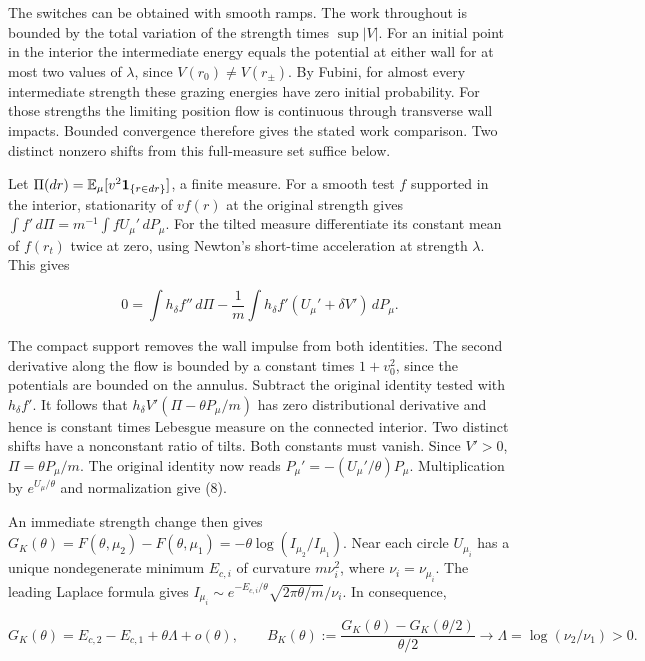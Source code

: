 \documentclass[11pt,a4paper]{article}
\begin{document}
The switches can be obtained with smooth ramps. The work throughout is
bounded by the total variation of the strength times \(\sup|V|\). For an
initial point in the interior the intermediate energy equals the
potential at either wall for at most two values of \(\lambda\), since
\(V(r_0)\ne V(r_\pm)\). By Fubini, for almost every intermediate
strength these grazing energies have zero initial probability. For those
strengths the limiting position flow is continuous through transverse
wall impacts. Bounded convergence therefore gives the stated work
comparison. Two distinct nonzero shifts from this full-measure set
suffice below.

Let \(\Pi(dr)=\mathbb E_\mu[v^2{\bf1}_{\{r\in dr\}}]\), a finite
measure. For a smooth test \(f\) supported in the interior, stationarity
of \(vf(r)\) at the original strength gives
\(\int f'\,d\Pi=m^{-1}\int f U_\mu'\,dP_\mu\). For the tilted measure
differentiate its constant mean of \(f(r_t)\) twice at zero, using
Newton's short-time acceleration at strength \(\lambda\). This gives

\[
 0=\int h_\delta f''\,d\Pi
    -\frac1m\int h_\delta f'(U_\mu'+\delta V')\,dP_\mu.             \tag{9}
\]

The compact support removes the wall impulse from both identities. The
second derivative along the flow is bounded by a constant times
\(1+v_0^2\), since the potentials are bounded on the annulus. Subtract
the original identity tested with \(h_\delta f'\). It follows that
\(h_\delta V'(\Pi-\theta P_\mu/m)\) has zero distributional derivative
and hence is constant times Lebesgue measure on the connected interior.
Two distinct shifts have a nonconstant ratio of tilts. Both constants
must vanish. Since \(V'>0\), \(\Pi=\theta P_\mu/m\). The original
identity now reads \(P_\mu'=-(U_\mu'/\theta)P_\mu\). Multiplication by
\(e^{U_\mu/\theta}\) and normalization give (8).

An immediate strength change then gives
\(G_K(\theta)=F(\theta,\mu_2)-F(\theta,\mu_1)
=-\theta\log(I_{\mu_2}/I_{\mu_1})\). Near each circle \(U_{\mu_i}\) has
a unique nondegenerate minimum \(E_{c,i}\) of curvature \(m\nu_i^2\),
where \(\nu_i=\nu_{\mu_i}\). The leading Laplace formula gives
\(I_{\mu_i}\sim e^{-E_{c,i}/\theta}\sqrt{2\pi\theta/m}/\nu_i\). In
consequence,

\[
 G_K(\theta)=E_{c,2}-E_{c,1}+\theta\Lambda+o(\theta),\qquad
 B_K(\theta):=\frac{G_K(\theta)-G_K(\theta/2)}{\theta/2}
       \longrightarrow \Lambda=\log(\nu_2/\nu_1)>0 .              \tag{10}
\]
\end{document}

